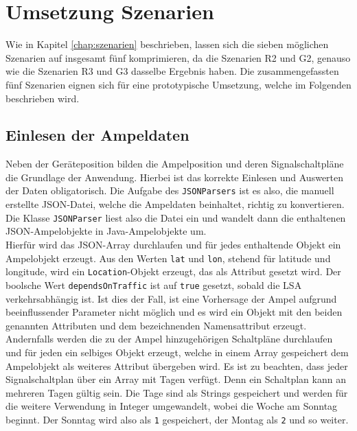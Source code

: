 \section{Umsetzung Szenarien}
Wie in Kapitel \ref{chap:szenarien} beschrieben, lassen sich die sieben möglichen Szenarien auf insgesamt fünf komprimieren, da die Szenarien R2 und G2, genauso wie die Szenarien R3 und G3 dasselbe Ergebnis haben. Die zusammengefassten fünf Szenarien eignen sich für eine prototypische Umsetzung, welche im Folgenden beschrieben wird.
%
%
\subsection{Einlesen der Ampeldaten}
Neben der Geräteposition bilden die Ampelposition und deren Signalschaltpläne die Grundlage der Anwendung. Hierbei ist das korrekte Einlesen und Auswerten der Daten obligatorisch. Die Aufgabe des \texttt{JSONParsers} ist es also, die manuell erstellte \gls{JSON}-Datei, welche die Ampeldaten beinhaltet, richtig zu konvertieren. Die Klasse \texttt{JSONParser} liest also die Datei ein und wandelt dann die enthaltenen \gls{JSON}-Ampelobjekte in Java-Ampelobjekte um.\\ 
Hierfür wird das \gls{JSON}-Array durchlaufen und für jedes enthaltende Objekt ein Ampelobjekt erzeugt. Aus den Werten \texttt{lat} und \texttt{lon}, stehend für latitude und longitude, wird ein \texttt{Location}-Objekt erzeugt, das als Attribut gesetzt wird. Der boolsche Wert \texttt{dependsOnTraffic} ist auf \texttt{true} gesetzt, sobald die \gls{LSA} verkehrsabhängig ist. Ist dies der Fall, ist eine Vorhersage der Ampel aufgrund beeinflussender Parameter nicht möglich und es wird ein Objekt mit den beiden genannten Attributen und dem bezeichnenden Namensattribut erzeugt. Andernfalls werden die zu der Ampel hinzugehörigen Schaltpläne durchlaufen und für jeden ein selbiges Objekt erzeugt, welche in einem Array gespeichert dem Ampelobjekt als weiteres Attribut übergeben wird. Es ist zu beachten, dass jeder Signalschaltplan über ein Array mit Tagen verfügt. Denn ein Schaltplan kann an mehreren Tagen gültig sein. Die Tage sind als Strings gespeichert und werden für die weitere Verwendung in Integer umgewandelt, wobei die Woche am Sonntag beginnt. Der Sonntag wird also als \texttt{1} gespeichert, der Montag als \texttt{2} und so weiter. 
%
%
